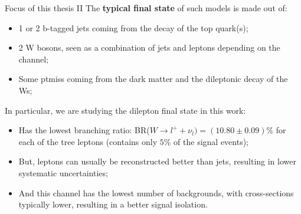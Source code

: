 \documentclass[8pt]{beamer}
\begin{document}
\begin{frame}{Focus of this thesis II}
\justifying
The \textbf{typical final state} of such models is made out of:
\begin{itemize}
\justifying
\item 1 or 2 b-tagged jets coming from the decay of the top quark(s);
\item 2 W bosons, seen as a combination of jets and leptons depending on the channel;
\item Some ptmiss coming from the dark matter and the dileptonic decay of the Ws;
\end{itemize} \vfill

In particular, we are studying the \alert{dilepton final state} in this work: 
\begin{itemize}
\justifying
\item Has the lowest branching ratio: BR($W \rightarrow l^+ + \nu_l) = (10.80 \pm 0.09)\%$ for each of the tree leptons (contains only $5\%$ of the signal events);
\item But, leptons can usually be reconstructed better than jets, resulting in lower systematic uncertainties;
\item And this channel has the lowest number of backgrounds, with cross-sections typically lower, resulting in a better signal isolation.
\end{itemize} \vfill

\end{frame}
\end{document}

